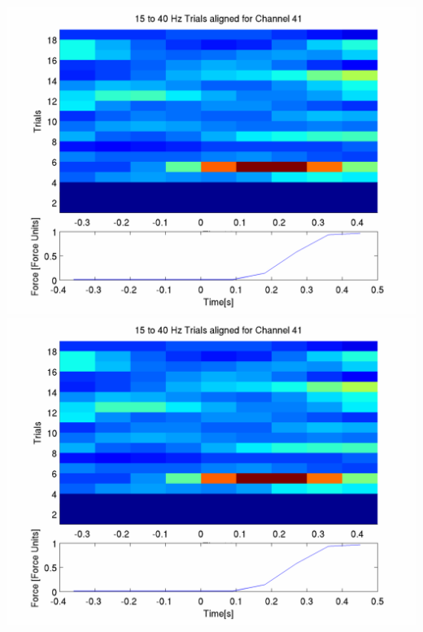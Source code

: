 \documentclass[12pt]{article}
\begin{document}
\includegraphics[scale=0.2]{noCAR/plot_4_aligned_trials.png}
\includegraphics[scale=0.2]{WithCAR/plot_4_aligned_trials.png}
\end{document}
